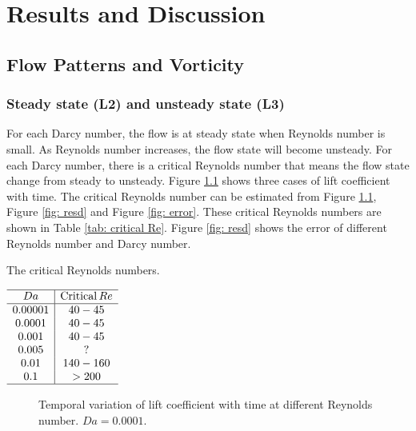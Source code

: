 \chapter{Results and Discussion}
\section{Flow Patterns and Vorticity}
\subsection{Steady state (L2) and unsteady state (L3)}
For each Darcy number, the flow is at steady state when Reynolds number is small. As Reynolds number increases, the flow state will become unsteady. For each Darcy number, there is a critical Reynolds number that means the flow state change from steady to unsteady. Figure \ref{fig: Cl_t} shows three cases of lift coefficient with time. The critical Reynolds number can be estimated from Figure \ref{fig: Cl_t}, Figure \ref{fig: resd} and Figure \ref{fig: error}.  These critical Reynolds numbers are shown in Table \ref{tab: critical Re}. Figure \ref{fig: resd} shows the error of different Reynolds number and Darcy number.

\begin{table}[]
	\centering
	\caption{The critical Reynolds numbers.}\label{tab: critical Re}
	$\begin{array}{c|c}
	\hline
	Da & \mathrm{Critical}\, Re \\ \hline
	0.00001& 40-45   \\
	0.0001 & 40-45 \\
	0.001  & 40-45 \\
	0.005  & ?   \\
	0.01   & 140-160 \\
	0.1    & >200\\
	\hline
	\end{array}$
\end{table}

\begin{figure}[!h]
	\setlength{\subfigcapskip}{-1bp}
	\centering
	\begin{minipage}{\textwidth}
		\centering
	\end{minipage}
	\centering
	\begin{minipage}{\textwidth}
		\centering
	\end{minipage}
	\vspace{0.2em}
	\caption{Temporal variation of lift coefficient with time at different Reynolds number. $Da=0.0001$.}
	\label{fig: Cl_t}
\end{figure}

